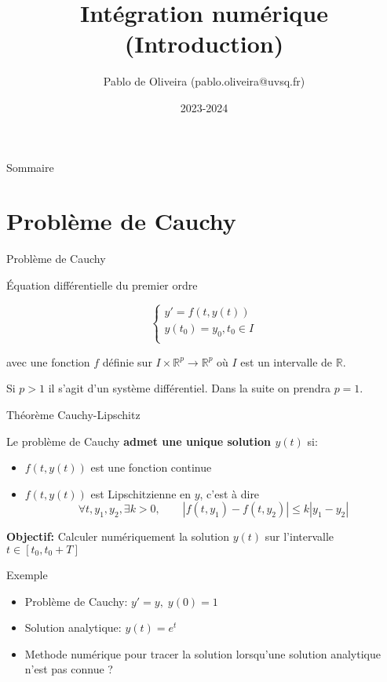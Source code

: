 \documentclass{beamer}
\title{Intégration numérique (Introduction)}
\author{Pablo de Oliveira (pablo.oliveira@uvsq.fr)}
\institute{M1 Calcul Haute Performance Simulation, Calcul Numérique}
\date{2023-2024}
\begin{document}
\maketitle

\begin{frame}{Sommaire}
    \tableofcontents
\end{frame}

\section{Problème de Cauchy}
\begin{frame}{Problème de Cauchy}

    Équation différentielle du premier ordre

    \begin{equation*}
        \left\{
        \begin{array}{l}
            y' = f(t,y(t))          \\
            y(t_0) = y_0, t_0 \in I \\
        \end{array}
        \right.
    \end{equation*}

    avec une fonction $f$ définie sur $I \times \mathbb{R}^p \rightarrow \mathbb{R}^p$ où $I$ est un intervalle de $\mathbb{R}$.

    Si $p > 1$ il s'agit d'un système différentiel. Dans la suite on prendra $p = 1$.
\end{frame}

\begin{frame}{Théorème Cauchy-Lipschitz}

    Le problème de Cauchy \textbf{admet une unique solution $y(t)$} si:
    \begin{itemize}
        \item $f(t, y(t))$ est une fonction continue
        \item $f(t, y(t))$ est Lipschitzienne en $y$, c'est à dire
              \[ \forall t,y_1,y_2, \exists k > 0, \qquad |f(t,y_1) - f(t,y_2)| \leq k|y_1-y_2| \]
    \end{itemize}
    \vfill

    \textbf{Objectif:} Calculer numériquement la solution $y(t)$ sur l'intervalle $t \in [t_0,t_0+T]$

\end{frame}

\begin{frame}{Exemple}
    \begin{itemize}
        \item Problème de Cauchy: $ y'=y,\; y(0) = 1$

        \item Solution analytique: $y(t)=e^t$

        \item Methode numérique pour tracer la solution lorsqu'une solution analytique n'est pas connue ?
    \end{itemize}

\end{frame}
\end{document}

